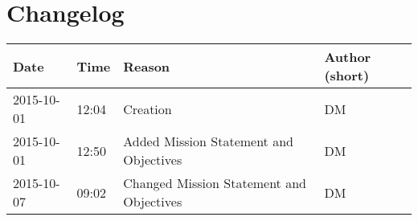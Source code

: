 \chapter{Changelog}

\begin{table}[h]
	\begin{tabularx}{\textwidth}{llll}
		Date & Time & Reason & Author (short)\\
		\toprule
		2015-10-01 & 12:04 & Creation & DM\\
		2015-10-01 & 12:50 & Added Mission Statement and Objectives & DM\\
		2015-10-07 & 09:02 & Changed Mission Statement and Objectives & DM\\
	\end{tabularx}
\end{table}

